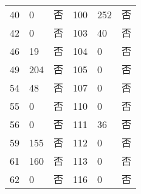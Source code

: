 \begin{table}[H]
\begin{tabular}{C{1.4cm}C{2.4cm}C{2.2cm}C{1.4cm}C{2.4cm}C{2.2cm}}
40  & 0          & 否       & 100 & 252        & 否       \\
42  & 0          & 否       & 103 & 40         & 否       \\
46  & 19         & 否       & 104 & 0          & 否       \\
49  & 204        & 否       & 105 & 0          & 否       \\
54  & 48         & 否       & 107 & 0          & 否       \\
55  & 0          & 否       & 110 & 0          & 否       \\
56  & 0          & 否       & 111 & 36         & 否       \\
59  & 155        & 否       & 112 & 0          & 否       \\
61  & 160        & 否       & 113 & 0          & 否       \\
62  & 0          & 否       & 116 & 0          & 否     \\
\bottomrule
\end{tabular}
\end{table}

